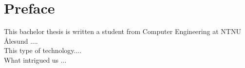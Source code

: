 \section*{Preface}

This bachelor thesis is written a student from Computer Engineering at NTNU Ålesund ....\\

This type of technology.... \\

What intrigued us ... 